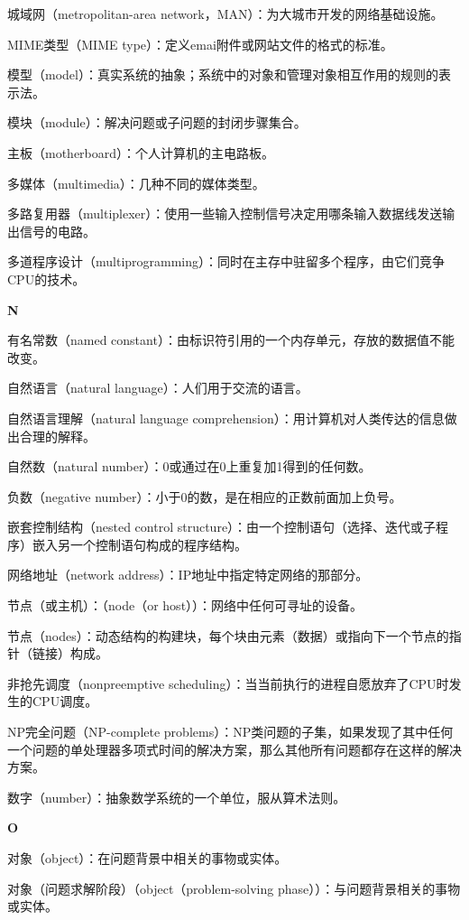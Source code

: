 城域网（metropolitan-area network，MAN）：为大城市开发的网络基础设施。

MIME类型（MIME type）：定义emai附件或网站文件的格式的标准。

模型（model）：真实系统的抽象；系统中的对象和管理对象相互作用的规则的表示法。

模块（module）：解决问题或子问题的封闭步骤集合。

主板（motherboard）：个人计算机的主电路板。

多媒体（multimedia）：几种不同的媒体类型。

多路复用器（multiplexer）：使用一些输入控制信号决定用哪条输入数据线发送输出信号的电路。

多道程序设计（multiprogramming）：同时在主存中驻留多个程序，由它们竞争CPU的技术。

\textbf{N}

有名常数（named constant）：由标识符引用的一个内存单元，存放的数据值不能改变。

自然语言（natural language）：人们用于交流的语言。

自然语言理解（natural language comprehension）：用计算机对人类传达的信息做出合理的解释。

自然数（natural number）：0或通过在0上重复加1得到的任何数。

负数（negative number）：小于0的数，是在相应的正数前面加上负号。

嵌套控制结构（nested control structure）：由一个控制语句（选择、迭代或子程序）嵌入另一个控制语句构成的程序结构。

网络地址（network address）：IP地址中指定特定网络的那部分。

节点（或主机）：（node（or host））：网络中任何可寻址的设备。

节点（nodes）：动态结构的构建块，每个块由元素（数据）或指向下一个节点的指针（链接）构成。

非抢先调度（nonpreemptive scheduling）：当当前执行的进程自愿放弃了CPU时发生的CPU调度。

NP完全问题（NP-complete problems）：NP类问题的子集，如果发现了其中任何一个问题的单处理器多项式时间的解决方案，那么其他所有问题都存在这样的解决方案。

数字（number）：抽象数学系统的一个单位，服从算术法则。

\textbf{O}

对象（object）：在问题背景中相关的事物或实体。

对象（问题求解阶段）（object（problem-solving phase））：与问题背景相关的事物或实体。


